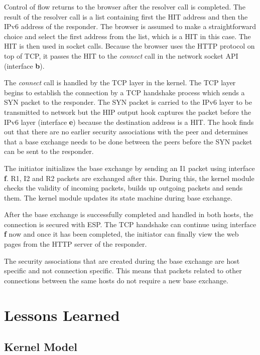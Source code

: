 Control of flow returns to the browser after the resolver call is
completed. The result of the resolver call is a list containing first
the HIT address and then the IPv6 address of the responder. The
browser is assumed to make a straightforward choice and select the
first address from the list, which is a HIT in this case. The HIT is
then used in socket calls. Because the browser uses the HTTP
\cite{rfc2616} protocol on top of TCP, it passes the HIT to the
\textit{connect} call in the network socket API (interface
\textbf{b}).

The \textit{connect} call is handled by the TCP layer in the kernel.
The TCP layer begins to establish the connection by a TCP handshake
process which sends a SYN packet to the responder. The SYN packet is
carried to the IPv6 layer to be transmitted to network but the HIP
output hook captures the packet before the IPv6 layer (interface
\textbf{e}) because the destination address is a HIT. The hook finds
out that there are no earlier security associations with the peer and
determines that a base exchange needs to be done between the peers
before the SYN packet can be sent to the responder.

The initiator initializes the base exchange by sending an I1 packet
using interface \textbf{f}. R1, I2 and R2 packets are exchanged after
this. During this, the kernel module checks the validity of incoming
packets, builds up outgoing packets and sends them. The kernel module
updates its state machine during base exchange.

After the base exchange is successfully completed and handled in both
hosts, the connection is secured with ESP. The TCP handshake can
continue using interface \textbf{f} now and once it has been
completed, the initiator can finally view the web pages from the HTTP
server of the responder.

The security associations that are created during the base exchange
are host specific and not connection specific. This means that packets
related to other connections between the same hosts do not require a
new base exchange.

\section{Lessons Learned}
\label{sec:lessons_learned}

\subsection{Kernel Model}
\label{sec:kernel_model_lessons}

